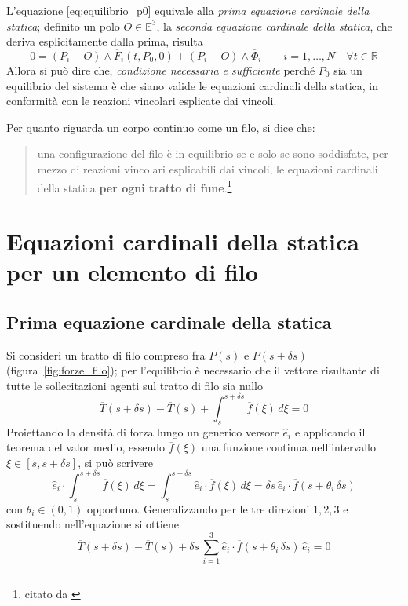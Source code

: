 L'equazione \eqref{eq:equilibrio_p0} equivale alla \emph{prima equazione cardinale della statica}; definito un polo $O\in\mathbb{E}^3$, la \emph{seconda equazione cardinale della statica}, che deriva esplicitamente dalla prima, risulta
\begin{equation*}
	0 = (P_i - O)\wedge\overline{F}_i(t,P_0, 0) + (P_i - O)\wedge\overline{\Phi}_i\qquad i=1,\dots,N\quad\forall t\in\mathbb{R}
\end{equation*}
Allora si può dire che, \emph{condizione necessaria e sufficiente} perché $P_0$ sia un equilibrio del sistema è che siano valide le equazioni cardinali della statica, in conformità con le reazioni vincolari esplicate dai vincoli.

Per quanto riguarda un corpo continuo come un filo, si dice che:
\begin{quotation}
	una configurazione del filo è in equilibrio se e solo se sono soddisfate, per mezzo di reazioni vincolari esplicabili dai vincoli, le equazioni cardinali della statica \textbf{per ogni tratto di fune}.\footnote{citato da \cite{siboni:funi}}
\end{quotation}

\section{Equazioni cardinali della statica per un elemento di filo}



\subsection{Prima equazione cardinale della statica}

Si consideri un tratto di filo compreso fra $P(s)$ e $P(s + \delta s)$ (figura~\ref{fig:forze_filo}); per l'equilibrio è necessario che il vettore risultante di tutte le sollecitazioni agenti sul tratto di filo sia nullo
\[
\overline{T}(s+\delta s) - \overline{T}(s) + \int_s^{s+\delta s} \overline{f}(\xi)\,d\xi = 0
\]
Proiettando la densità di forza lungo un generico versore $\hat{e}_i$ e applicando il teorema del valor medio, essendo $\overline{f}(\xi)$ una funzione continua nell'intervallo $\xi\in [s, s +\delta s]$, si può scrivere
\[
\hat{e}_i \cdot \int_s^{s+\delta s} \overline{f}(\xi)\,d\xi = \int_s^{s+\delta s} \hat{e}_i\cdot \overline{f}(\xi)\,d\xi = \delta s\,\hat{e}_i\cdot\overline{f}(s+ \theta_i\,\delta s)
\]
con $\theta_i\in (0,1)$ opportuno. Generalizzando per le tre direzioni $1, 2, 3$ e sostituendo nell'equazione si ottiene
\begin{equation*}
\overline{T}(s+\delta s) - \overline{T}(s) + \delta s\,\sum_{i=1}^3 \hat{e}_i\cdot \overline{f}(s+\theta_i\,\delta s)\,\hat{e}_i = 0
\end{equation*}

